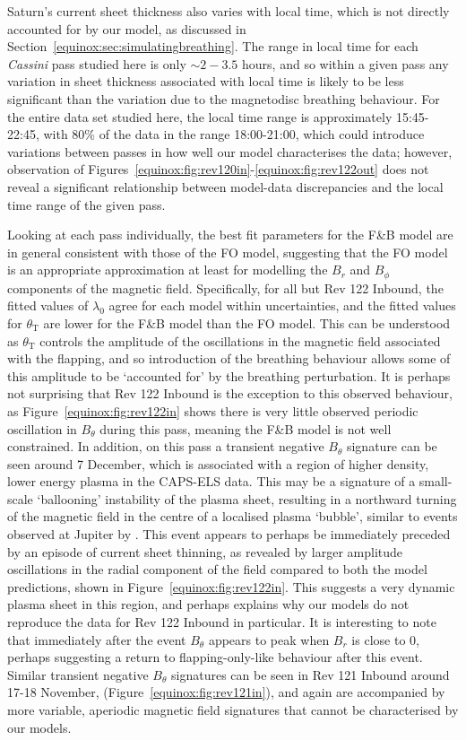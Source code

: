 Saturn's current sheet thickness also varies with local time, which is not directly accounted for by our model, as discussed in Section~\ref{equinox:sec:simulatingbreathing}. The range in local time for each \textit{Cassini} pass studied here is only $\sim2-3.5$ hours, and so within a given pass any variation in sheet thickness associated with local time is likely to be less significant than the variation due to the magnetodisc breathing behaviour. For the entire data set studied here, the local time range is approximately 15:45-22:45, with 80\% of the data in the range 18:00-21:00, which could introduce variations between passes in how well our model characterises the data; however, observation of Figures~\ref{equinox:fig:rev120in}-\ref{equinox:fig:rev122out} does not reveal a significant relationship between model-data discrepancies and the local time range of the given pass.

Looking at each pass individually, the best fit parameters for the F{\&}B model are in general consistent with those of the FO model, suggesting that the FO model is an appropriate approximation at least for modelling the $B_{r}$ and $B_{\phi}$ components of the magnetic field. Specifically, for all but Rev 122 Inbound, the fitted values of $\lambda_0$ agree for each model within uncertainties, and the fitted values for $\theta_\mathrm{T}$ are lower for the F{\&}B model than the FO model. This can be understood as $\theta_\mathrm{T}$ controls the amplitude of the oscillations in the magnetic field associated with the flapping, and so introduction of the breathing behaviour allows some of this amplitude to be `accounted for' by the breathing perturbation. It is perhaps not surprising that Rev 122 Inbound is the exception to this observed behaviour, as Figure~\ref{equinox:fig:rev122in} shows there is very little observed periodic oscillation in $B_{\theta}$ during this pass, meaning the F{\&}B model is not well constrained. In addition, on this pass a transient negative $B_{\theta}$ signature can be seen around 7 December, which is associated with a region of higher density, lower energy plasma in the CAPS-ELS data. This may be a signature of a small-scale `ballooning' instability of the plasma sheet, resulting in a northward turning of the magnetic field in the centre of a localised plasma `bubble', similar to events observed at Jupiter by {\citet{kivelson2005}. This event appears to perhaps be immediately preceded by an episode of current sheet thinning, as revealed by larger amplitude oscillations in the radial component of the field compared to both the model predictions, shown in Figure~\ref{equinox:fig:rev122in}.} This suggests a very dynamic plasma sheet in this region, and perhaps explains why our models do not reproduce the data for Rev 122 Inbound in particular. It is interesting to note that immediately after the event $B_\theta$ appears to peak when $B_r$ is close to 0, perhaps suggesting a return to flapping-only-like behaviour after this event. Similar transient negative $B_\theta$ signatures can be seen in Rev 121 Inbound around 17{\--}18 November, (Figure~\ref{equinox:fig:rev121in}), and again are accompanied by more variable, aperiodic magnetic field signatures that cannot be characterised by our models.

